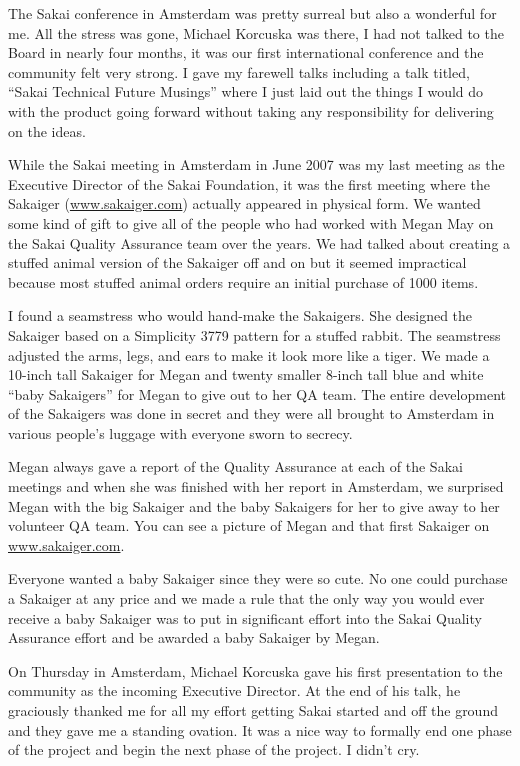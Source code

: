 \documentclass[12pt]{book}
\begin{document}
The Sakai conference in Amsterdam was pretty surreal but also a wonderful for me.
All the stress was gone, Michael Korcuska was there, I had not talked to the Board in nearly
four months, it was our first international conference and the community felt very strong.
I gave my farewell talks including a talk titled, ``Sakai Technical Future Musings'' where
I just laid out the things I would do with the product going forward without taking any
responsibility for delivering on the ideas.

While the Sakai meeting in Amsterdam in June 2007 was my last meeting as the
Executive Director of the Sakai Foundation, it was the first meeting where
the Sakaiger (\url{www.sakaiger.com}) actually appeared in physical form.  We wanted
some kind of gift to give all of the people who had worked with Megan May on
the Sakai Quality Assurance team over the years.  We had talked about creating
a stuffed animal version of the Sakaiger off and on but it seemed impractical
because most stuffed animal orders require an initial purchase of 1000 items.

I found a seamstress who would hand-make the Sakaigers.   She designed
the Sakaiger based on a Simplicity 3779 pattern for a stuffed rabbit.  The seamstress
adjusted the arms, legs, and ears to make it look more like a tiger.   We made a 10-inch tall
Sakaiger for Megan and twenty smaller 8-inch tall blue and white ``baby Sakaigers'' for
Megan to give out to her QA team.   The entire development of the Sakaigers was
done in secret and they were all brought to Amsterdam in various people's
luggage with everyone sworn to secrecy.

Megan always gave a report of the Quality Assurance at each of the Sakai meetings
and when she was finished with her report in Amsterdam, we surprised Megan with the
big Sakaiger and the baby Sakaigers for her to give away to her
volunteer QA team.  You can see a picture of Megan and that first Sakaiger on
\url{www.sakaiger.com}.

Everyone wanted a baby Sakaiger since they were so cute. No one could purchase
a Sakaiger at any price and we made a rule that the only way you would ever
receive a baby Sakaiger was to put in significant effort into the Sakai Quality
Assurance effort and be awarded a baby Sakaiger by Megan.

On Thursday in Amsterdam, Michael Korcuska gave his first presentation to the
community as the incoming Executive Director.   At the end of his talk, he graciously
thanked me for all my effort getting Sakai started and off the ground and they
gave me a standing ovation.  It was a nice way to formally end one phase of
the project and begin the next phase of the project.   I didn't cry.
\end{document}
